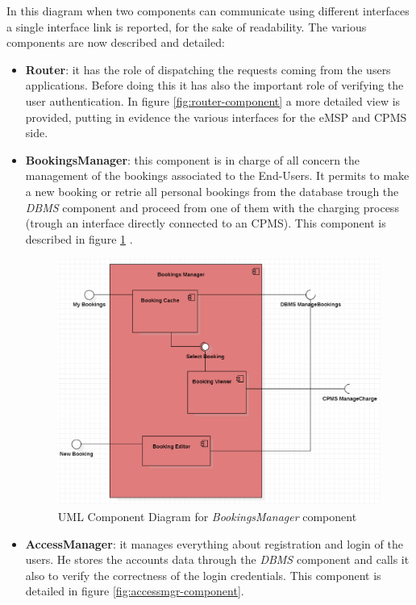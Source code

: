 \documentclass[a4paper]{report}
\begin{document}
In this diagram when two components can communicate using different interfaces a single interface link is 
reported, for the sake of readability. The various components are now described and detailed:
\begin{itemize}
\item \textbf{Router}: it has the role of dispatching the requests coming from the users applications. Before doing this it has also the important role of verifying the user authentication. In figure \ref{fig:router-component} a more detailed view is provided, putting in evidence the various interfaces for the eMSP and CPMS side.

\item \textbf{BookingsManager}: this component is in charge of all concern the management of the bookings associated to the End-Users. It permits to make a new booking or retrie all personal bookings from the database trough the \textit{DBMS} component and proceed from one of them with the charging process (trough an interface directly connected to an CPMS). This component is described in figure \ref{fig:bookingsmgr-component} .


\begin{figure}[htp]
\includegraphics[scale=0.6]{img/BOOKINGS MANAGER.png}
\caption{UML Component Diagram for \textit{BookingsManager} component}
\label{fig:bookingsmgr-component}
\end{figure}

\item \textbf{AccessManager}: it manages everything about registration and login of the users. He stores the accounts data through the \textit{DBMS} component and calls it also to verify the correctness of the login credentials. This component is detailed in figure \ref{fig:accessmgr-component}.


\end{itemize}
\end{document}
